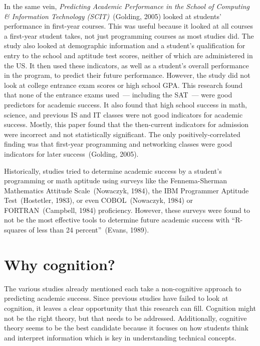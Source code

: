 In the same vein, \textit{Predicting Academic Performance in the School of Computing \& Information Technology (SCIT)}~(Golding, 2005) looked at students' performance in first-year courses. This was useful because it looked at all courses a first-year student takes, not just programming courses as most studies did. The study also looked at demographic information and a student's qualification for entry to the school and aptitude test scores, neither of which are administered in the US. It then used these indicators, as well as a student's overall performance in the program, to predict their future performance. However, the study did not look at college entrance exam scores or high school GPA. This research found that none of the entrance exams used~--- including the SAT~--- were good predictors for academic success. It also found that high school success in math, science, and previous IS and IT classes were not good indicators for academic success. Mostly, this paper found that the then-current indicators for admission were incorrect and not statistically significant. The only positively-correlated finding was that first-year programming and networking classes were good indicators for later success~(Golding, 2005).

Historically, studies tried to determine academic success by a student's programming or math aptitude using surveys like the Fennema-Sherman Mathematics Attitude Scale~(Nowaczyk, 1984), the IBM Programmer Aptitude Test~(Hostetler, 1983), or even COBOL~(Nowaczyk, 1984) or FORTRAN~(Campbell, 1984) proficiency. However, these surveys were found to not be the most effective tools to determine future academic success with ``R-squares of less than 24 percent''~(Evans, 1989).

\section{Why cognition?}
The various studies already mentioned each take a non-cognitive approach to predicting academic success. Since previous studies have failed to look at cognition, it leaves a clear opportunity that this research can fill. Cognition might not be the right theory, but that needs to be addressed. Additionally, cognitive theory seems to be the best candidate because it focuses on how students think and interpret information which is key in understanding technical concepts.

